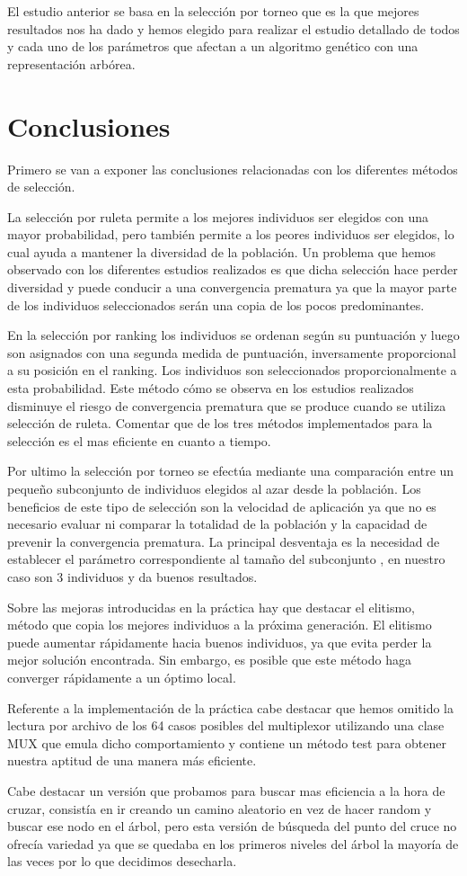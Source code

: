 \documentclass[12pt]{article}
\begin{document}
El estudio anterior se basa en la selección por torneo que es la que mejores resultados nos ha dado y hemos elegido para realizar el estudio detallado de todos y cada uno de los parámetros que afectan a un algoritmo genético con una representación arbórea.

\section{Conclusiones}

Primero se van a exponer las conclusiones relacionadas con los diferentes métodos de selección.

La selección por ruleta permite a los mejores individuos ser elegidos con una mayor probabilidad, pero también permite a los peores individuos ser elegidos, lo cual ayuda a mantener la diversidad de la población.
Un problema que hemos observado con los diferentes estudios realizados es que dicha selección hace perder diversidad y puede conducir a una convergencia prematura ya que la mayor parte de los individuos seleccionados serán una copia de los pocos predominantes.

En la selección por ranking los individuos se ordenan según su puntuación y luego son asignados con una segunda medida de puntuación, inversamente proporcional a su posición en el ranking. Los individuos son seleccionados proporcionalmente a esta probabilidad. Este método cómo se observa en los estudios realizados disminuye el riesgo de convergencia prematura que se produce cuando se utiliza selección de ruleta. Comentar que de los tres métodos implementados para la selección es el mas eficiente en cuanto a tiempo.

Por ultimo la selección por torneo se efectúa mediante una comparación entre un pequeño subconjunto de individuos elegidos al azar desde la población.
Los beneficios de este tipo de selección son la velocidad de aplicación ya que no es necesario evaluar ni comparar la totalidad de la población y la capacidad de prevenir la convergencia prematura. La principal desventaja es la necesidad de establecer el parámetro correspondiente al tamaño del subconjunto , en nuestro caso son 3 individuos y da buenos resultados.

Sobre las mejoras introducidas en la práctica hay que destacar el elitismo, método que copia los mejores individuos a la
próxima generación. El elitismo puede aumentar rápidamente hacia buenos individuos, ya que evita perder la mejor solución encontrada. Sin embargo,
es posible que este método haga converger rápidamente a un óptimo local.

Referente a la implementación de la práctica cabe destacar que hemos omitido la lectura por archivo de los 64 casos posibles del multiplexor utilizando una clase MUX que emula dicho comportamiento y contiene un método test para obtener nuestra aptitud de una manera más eficiente.

Cabe destacar un versión que probamos para buscar mas eficiencia a la hora de cruzar, consistía en ir creando un camino aleatorio en vez de hacer random y buscar ese nodo en el árbol, pero esta versión de búsqueda del punto del cruce no ofrecía variedad ya que se quedaba en los primeros niveles del árbol la mayoría de las veces por lo que decidimos desecharla.
\end{document}
